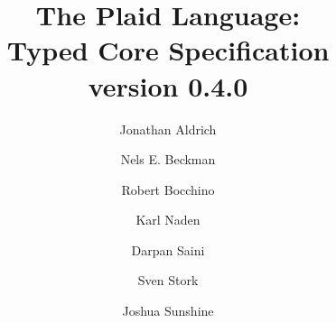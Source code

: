 \documentclass[12pt]{article}
\title{The Plaid Language:\\
Typed Core Specification\\
\vspace{2ex}
version 0.4.0\\
\vspace{2ex}
}
\author{Jonathan Aldrich \and Nels E. Beckman \and Robert Bocchino \and Karl Naden \and Darpan Saini \and Sven Stork \and Joshua Sunshine}
\date{\monthname~\the \year}
\begin{document}
\renewcommand*{\thepage}{title-\arabic{page}} 
\maketitle
\renewcommand*{\thepage}{\arabic{page}} 

















\end{document}
